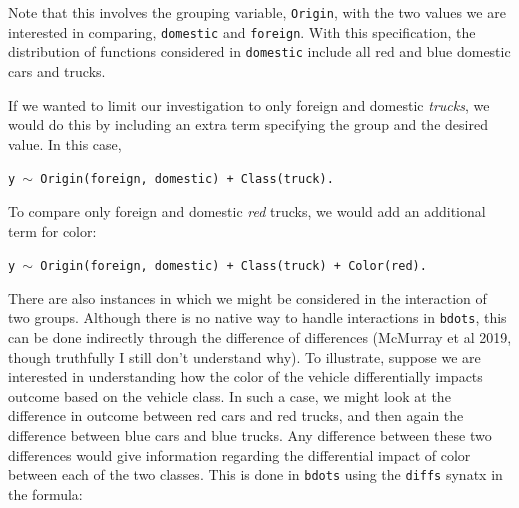 \documentclass{article}
\newcommand{\xt}{\texttt}%
\begin{document}
Note that this involves the grouping variable, \xt{Origin}, with the two values we are interested in comparing, \xt{domestic} and \xt{foreign}. With this specification, the distribution of functions considered in \xt{domestic} include all red and blue domestic cars and trucks.


If we wanted to limit our investigation to only foreign and domestic \textit{trucks}, we would do this by including an extra term specifying the group and the desired value. In this case, 

\begin{center}
\tt y $\sim$ Origin(foreign, domestic) + Class(truck).
\end{center}
To compare only foreign and domestic \textit{red} trucks, we would add an additional term for color:

\begin{center}
\tt y $\sim$ Origin(foreign, domestic) + Class(truck) + Color(red).
\end{center}

There are also instances in which we might be considered in the interaction of two groups. Although there is no native way to handle interactions in \xt{bdots}, this can be done indirectly through the difference of differences (McMurray et al 2019, though truthfully I still don't understand why). To illustrate, suppose we are interested in understanding how the color of the vehicle differentially impacts outcome based on the vehicle class. In such a case, we might look at the difference in outcome between red cars and red trucks, and then again the difference between blue cars and blue trucks. Any difference between these two differences would give information regarding the differential impact of color between each of the two classes. This is done in \xt{bdots} using the \xt{diffs} synatx in the formula:



\end{document}
